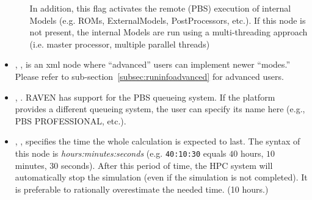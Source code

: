 \begin{itemize}
\begin{itemize}
\begin{itemize}
         \end{itemize}
         In addition, this flag activates the remote (PBS) execution of internal Models (e.g. ROMs,
         ExternalModels, PostProcessors, etc.). If this node is not present, the internal Models
           are run using a multi-threading approach (i.e. master processor, multiple parallel threads)
   \end{itemize}


\item {}, , is an
xml node where ``advanced'' users can implement newer ``modes.''
%
Please refer to sub-section~\ref{subsec:runinfoadvanced} for advanced users.

\item {}, .
RAVEN has support for the PBS queueing system. If the platform provides a
different queueing system, the user can specify its name here (e.g., PBS
PROFESSIONAL, etc.).
%

\item {}, , specifies the time the whole calculation is expected to
last.
%
The syntax of this node is \textit{hours:minutes:seconds} (e.g.
\texttt{40:10:30} equals $40$ hours, $10$ minutes, $30$ seconds). After this
period of time, the HPC system will automatically stop the simulation (even if
the simulation is not completed). It is preferable to rationally overestimate
the needed time.
%
 (10 hours.)
\end{itemize}

